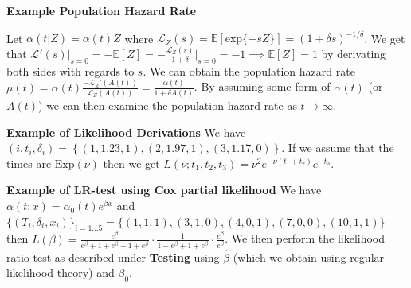 \documentclass{article}
\begin{document}
\medskip

\textbf{Example Population Hazard Rate}

Let $\alpha(t|Z) = \alpha(t)Z$ where $\mathcal{L}_Z(s) = \mathbb{E}[\text{exp}\{-sZ\}] = (1+\delta s)^{-1/\delta}$. We get that $\mathcal{L}'(s)\big|_{s=0}  = -\mathbb{E}[Z] = -\frac{\mathcal{L}_Z(s)}{1+\delta }\big|_{s=0} = -1 \implies \mathbb{E}[Z] = 1$ by derivating both sides with regards to $s$. We can obtain the population hazard rate $\mu(t) = \alpha(t)\frac{-\mathcal{L}_Z'(A(t))}{\mathcal{L}_Z(A(t))} = \frac{\alpha(t)}{1 + \delta A(t)}$. By assuming some form of $\alpha(t)$ (or $A(t)$) we can then examine the population hazard rate as $t \to \infty$. 

\medskip

\textbf{Example of Likelihood Derivations} We have $(i, t_i, \delta_i) = \left\{(1,1.23,1),(2,1.97,1),(3, 1.17, 0)\right\}$. If we assume that the times are $\text{Exp}(\nu)$ then we get $L(\nu; t_1, t_2, t_3) = \nu^2 e^{-\nu(t_1 + t_2)} e^{-t_3}$. 

\medskip

\textbf{Example of LR-test using Cox partial likelihood}
We have $\alpha(t; x) = \alpha_0(t)e^{\beta x}$ and 
$\{(T_i, \delta_i, x_i)\}_{i=1...5} = \{(1, 1, 1),(3, 1, 0),(4, 0, 1),(7, 0, 0),(10, 1, 1) \}$ then $L(\beta) = \frac{e^{\beta}}{e^{\beta}+1+e^{\beta}+1+e^{\beta}} \cdot \frac{1}{1+e^{\beta}+1+e^{\beta}} \cdot \frac{e^{\beta}}{e^{\beta}}$. We then perform the likelihood ratio test as described under \textbf{Testing} using $\hat\beta$ (which we obtain using regular likelihood theory) and $\beta_0$. 
\end{document}
